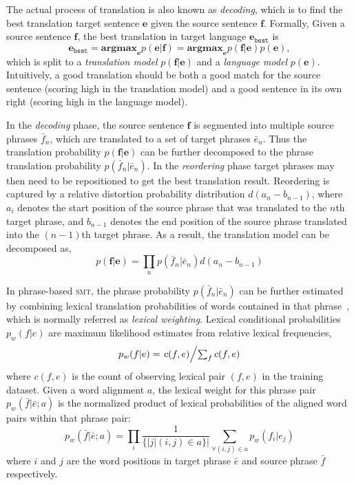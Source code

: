 The actual process of translation is also known as \textit{decoding},
which is to find the best translation target sentence $\mathbf{e}$ 
given the source sentence $\mathbf{f}$. Formally,
Given a source sentence $\mathbf{f}$, the best
translation in target language $\mathbf{e}_\texttt{best}$ is
\begin{equation}
\mathbf{e}_\texttt{best} = \textbf{argmax}_\mathbf{e} p(\mathbf{e}|\mathbf{f}) = \textbf{argmax}_\mathbf{e} p(\mathbf{f}|\mathbf{e}) p (\mathbf{e}),
\end{equation}
which is split to a \textit{translation model}
$p(\mathbf{f}|\mathbf{e})$ and a \textit{language model} $p
(\mathbf{e})$.
Intuitively, a good translation should be both a good match for the source sentence (scoring high in the translation model) 
and a good sentence in its own right (scoring high in the language model).

In the \textit{decoding} phase, the source sentence $\mathbf{f}$ is segmented into multiple source
phrases $\bar{f}_n$, which are translated to a set
of target phrases $\bar{e}_n$. Thus the translation probability
$p(\mathbf{f}|\mathbf{e})$ can be further decomposed to the phrase
translation probability $p(\bar{f}_n | \bar{e}_n)$.
In the \textit{reordering} phase target phrases may then need to be repositioned to get the best
translation result. Reordering is captured by a relative distortion
probability distribution $d(a_n - b_{n-1})$, where $a_i$ denotes the
start position of the source phrase that was translated to the $n$th
target phrase, and $b_{n-1}$ denotes the end position of the source
phrase translated into the $(n-1)$th target phrase. As a result, the
translation model can be decomposed as,
\begin{equation}
p(\mathbf{f}|\mathbf{e}) = \prod_{n} p(\bar{f}_n | \bar{e}_n) d(a_n - b_{n-1})
\end{equation}

In phrase-based \textsc{smt}, the phrase probability $p(\bar{f}_n |
\bar{e}_n)$ can be further estimated by combining lexical translation
probabilities of words contained in that phrase~\citep{koehn-03},
which is normally referred as \textit{lexical weighting}. Lexical
conditional probabilities $p_w(f|e)$ are maximum likelihood estimates
from relative lexical frequencies,
\begin{equation}
\label{eq:lexical_prob}
p_w(f|e) = \textstyle \left.c(f, e)\middle/\sum_f{c(f, e)}\right.
\end{equation}
where $c(f, e)$ is the count of observing lexical pair $(f, e)$ in the
training dataset. Given a word alignment $a$, the lexical weight for
this phrase pair $p_w(\bar{f} | \bar{e}; a)$ is the normalized product
of lexical probabilities of the aligned word pairs within that phrase
pair:
\begin{equation}
\label{eq:phrase_prob}
p_w(\bar{f} | \bar{e}; a) = \prod_{i} \frac{1}{\{|j | (i, j) \in a\}|} \sum_{\forall (i,j) \in a} p_w(f_i | e_j)
\end{equation}
where $i$ and $j$ are the word positions in target phrase $\bar{e}$
and source phrase $\bar{f}$ respectively.

